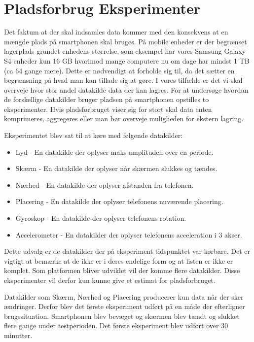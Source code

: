 \section{Pladsforbrug Eksperimenter}\label{eksperimenter}
Det faktum at der skal indsamles data kommer med den konsekvens at en mængde plads på smartphonen skal bruges.
På mobile enheder er der begrænset lagerplads grundet enhedens størrelse, som eksempel har vores Samsung Galaxy S4 enheder kun 16 GB hvorimod mange computere nu om dage har mindst 1 TB (ca 64 gange mere).
Dette er nødvendigt at forholde sig til, da det sætter en begrænsning på hvad man kan tillade sig at gøre.
I vores tilfælde er det vi skal overveje hvor stor andel datakilde data der kan lagres.
For at undersøge hvordan de forskellige datakilder bruger pladsen på smartphonen opstilles to eksperimenter.
Hvis pladsforbruget viser sig for stort skal data enten komprimeres, aggregeres eller man bør overveje muligheden for ekstern lagring.

Eksperimentet blev sat til at køre med følgende datakilder:

\begin{itemize}
	\item Lyd - En datakilde der oplyser maks amplituden over en periode.
	\item Skærm - En datakilde der oplyser når skærmen slukkes og tændes.
	\item Nærhed - En datakilde der oplyser afstanden fra telefonen.
	\item Placering - En datakilde der oplyser telefonens nuværende placering.
	\item Gyroskop - En datakilde der oplyser telefonens rotation.
	\item Accelerometer - En datakilder der oplyser telefonens acceleration i 3 akser.
\end{itemize}

Dette udvalg er de datakilder der på eksperiment tidspunktet var kørbare.
Det er vigtigt at bemærke at de ikke er i deres endelige form og at listen er ikke er komplet.
Som platformen bliver udviklet vil der komme flere datakilder.
Disse eksperimenter vil derfor kun kunne give et estimat for pladsforbruget.

Datakilder som Skærm, Nærhed og Placering producerer kun data når der sker ændringer. 
Derfor blev det første eksperiment udført på en måde der efterligner brugssituation. 
Smartphonen blev bevæget og skærmen blev tændt og slukket flere gange under testperioden.
Det første eksperiment blev udført over 30 minutter.

